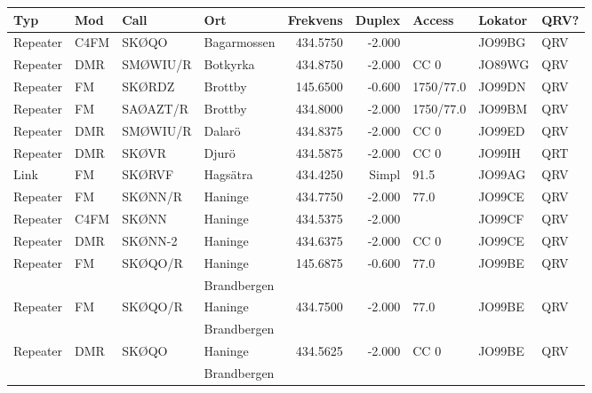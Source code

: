 \begin{longtable}{llllrrlll}
\bf Typ  & \bf Mod     & \bf Call & \bf Ort     & \bf Frekvens & \bf Duplex & \bf Access & \bf Lokator & \bf QRV? \\ \hline
Repeater & C4FM        & SKØQO    & Bagarmossen & 434.5750     & -2.000     &            & JO99BG      & QRV      \\
Repeater & DMR         & SMØWIU/R & Botkyrka    & 434.8750     & -2.000     & CC 0       & JO89WG      & QRV      \\
Repeater & FM          & SKØRDZ   & Brottby     & 145.6500     & -0.600     & 1750/77.0  & JO99DN      & QRV      \\
Repeater & FM          & SAØAZT/R & Brottby     & 434.8000     & -2.000     & 1750/77.0  & JO99BM      & QRV      \\
Repeater & DMR         & SMØWIU/R & Dalarö      & 434.8375     & -2.000     & CC 0       & JO99ED      & QRV      \\
Repeater & DMR         & SKØVR    & Djurö       & 434.5875     & -2.000     & CC 0       & JO99IH      & QRT      \\
Link     & FM          & SKØRVF   & Hagsätra    & 434.4250     & Simpl      & 91.5       & JO99AG      & QRV      \\
Repeater & FM          & SKØNN/R  & Haninge     & 434.7750     & -2.000     & 77.0       & JO99CE      & QRV      \\
Repeater & C4FM        & SKØNN    & Haninge     & 434.5375     & -2.000     &            & JO99CF      & QRV      \\
Repeater & DMR         & SKØNN-2  & Haninge     & 434.6375     & -2.000     & CC 0       & JO99CE      & QRV      \\
Repeater & FM          & SKØQO/R  & Haninge     & 145.6875     & -0.600     & 77.0       & JO99BE      & QRV      \\
         &             &          & Brandbergen &              &            &            &             &          \\
Repeater & FM          & SKØQO/R  & Haninge     & 434.7500     & -2.000     & 77.0       & JO99BE      & QRV      \\
         &             &          & Brandbergen &              &            &            &             &          \\
Repeater & DMR         & SKØQO    & Haninge     & 434.5625     & -2.000     & CC 0       & JO99BE      & QRV      \\
         &             &          & Brandbergen &              &            &            &             &          \\

\end{longtable}

